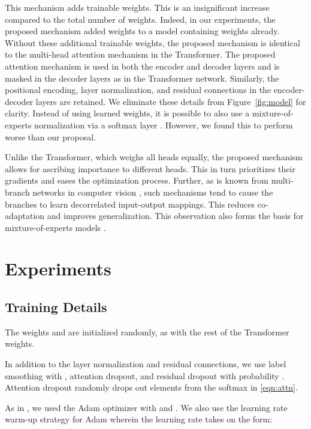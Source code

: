 \documentclass{article} \usepackage{iclr2018_conference,times}
\begin{document}
{This mechanism adds  trainable weights. This is an insignificant increase compared to the total number of weights. Indeed, in our experiments, the proposed mechanism added  weights to a model containing  weights already. Without these additional trainable weights, the proposed mechanism is identical to the multi-head attention mechanism in the Transformer. The proposed attention mechanism is used in both the encoder and decoder layers and is masked in the decoder layers as in the Transformer network. Similarly, the positional encoding, layer normalization, and residual connections in the encoder-decoder layers are retained. We eliminate these details from Figure~\ref{fig:model} for clarity. Instead of using  learned weights, it is possible to also use a mixture-of-experts normalization via a softmax layer \citep{shazeer2017outrageously}. However, we found this to perform worse than our proposal. 

Unlike the Transformer, which weighs all heads equally, the proposed mechanism allows for ascribing importance to different heads. This in turn prioritizes their gradients and eases the optimization process. Further, as is known from multi-branch networks in computer vision \citep{gastaldi2017shake}, such mechanisms tend to cause the branches to learn decorrelated input-output mappings. This reduces co-adaptation and improves generalization. This observation also forms the basis for mixture-of-experts models \citep{shazeer2017outrageously}. }

\section{Experiments}

\subsection{Training Details}

The weights  and  are initialized randomly, as with the rest of the Transformer weights. 

In addition to the layer normalization and residual connections, we use label smoothing with , attention dropout, and residual dropout with probability . Attention dropout randomly drops out elements \citep{srivastava2014dropout} from the softmax in \eqref{eqn:attn}.

As in \citet{vaswani2017attention}, we used the Adam optimizer \citep{kingma2014adam} with  and . We also use the learning rate warm-up strategy for Adam wherein the learning rate  takes on the form:
\end{document}
